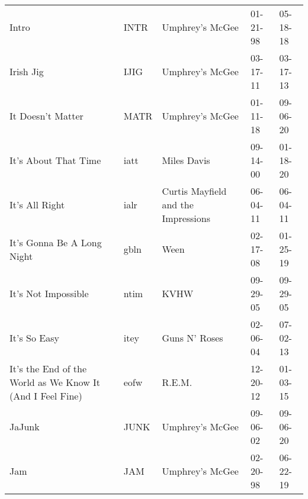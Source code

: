 \begin{longtable}{p{}p{}p{}p{}p{}}
                                                                   Intro &          INTR &                                          Umphrey's McGee &              01-21-98 &             05-18-18 \\
                                                               Irish Jig &          IJIG &                                          Umphrey's McGee &              03-17-11 &             03-17-13 \\
                                                       It Doesn't Matter &          MATR &                                          Umphrey's McGee &              01-11-18 &             09-06-20 \\
                                                    It's About That Time &          iatt &                                              Miles Davis &              09-14-00 &             01-18-20 \\
                                                          It's All Right &          ialr &                      Curtis Mayfield and the Impressions &              06-04-11 &             06-04-11 \\
                                              It's Gonna Be A Long Night &          gbln &                                                     Ween &              02-17-08 &             01-25-19 \\
                                                     It's Not Impossible &          ntim &                                                     KVHW &              09-29-05 &             09-29-05 \\
                                                            It's So Easy &          itey &                                            Guns N' Roses &              02-06-04 &             07-02-13 \\
               It's the End of the World as We Know It (And I Feel Fine) &          eofw &                                                   R.E.M. &              12-20-12 &             01-03-15 \\
                                                                  JaJunk &          JUNK &                                          Umphrey's McGee &              09-06-02 &             09-06-20 \\
                                                                     Jam &           JAM &                                          Umphrey's McGee &              02-20-98 &             06-22-19 \\

\end{longtable}
